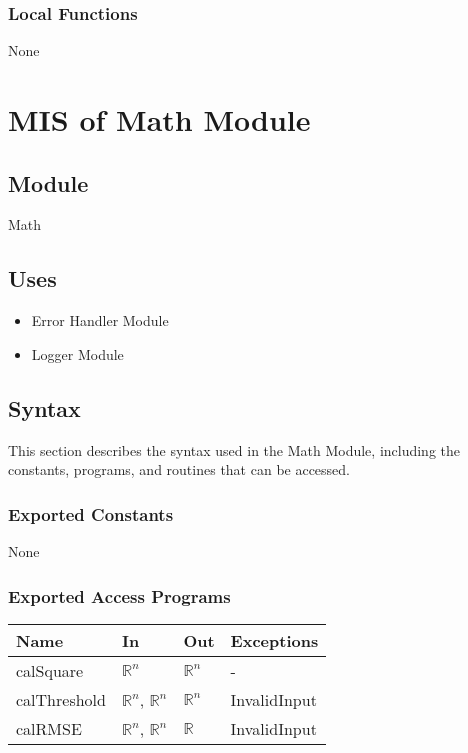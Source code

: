 \documentclass[12pt, titlepage]{article}
\begin{document}
\subsubsection{Local Functions}

None

\newpage

\section{MIS of Math Module} \label{MIS_Math}

\subsection{Module}

Math

\subsection{Uses}

\begin{itemize}
\item Error Handler Module
\item Logger Module
\end{itemize}

\subsection{Syntax}

This section describes the syntax used in the Math Module, including the
constants, programs, and routines that can be accessed.

\subsubsection{Exported Constants}

None

\subsubsection{Exported Access Programs}

\begin{center}
\begin{tabular}{p{2cm} p{4cm} p{4cm} p{2cm}}
\hline
\textbf{Name} & \textbf{In} & \textbf{Out} & \textbf{Exceptions} \\
\hline
calSquare & $\mathbb{R}^n$ & $\mathbb{R}^n$ & - \\
calThreshold & $\mathbb{R}^n$, $\mathbb{R}^n$ & $\mathbb{R}^n$ & InvalidInput \\
calRMSE & $\mathbb{R}^n$, $\mathbb{R}^n$ & $\mathbb{R}$ & InvalidInput \\
\hline
\end{tabular}
\end{center}
\end{document}
